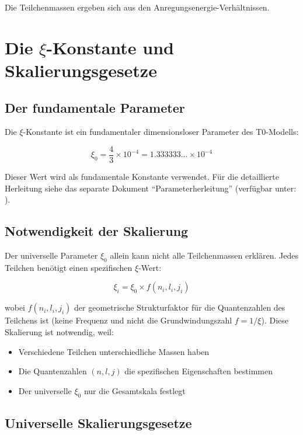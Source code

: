 	Die Teilchenmassen ergeben sich aus den Anregungsenergie-Verhältnissen.
	
	
\section{Die $\xi$-Konstante und Skalierungsgesetze}

\subsection{Der fundamentale Parameter}

Die $\xi$-Konstante ist ein fundamentaler dimensionsloser Parameter des T0-Modells:

\begin{equation}
	\boxed{\xi_0 = \frac{4}{3} \times 10^{-4} = 1.333333... \times 10^{-4}}
\end{equation}

	Dieser Wert wird als fundamentale Konstante verwendet. Für die detaillierte Herleitung 
	siehe das separate Dokument ``Parameterherleitung'' 
	(verfügbar unter: ).

\subsection{Notwendigkeit der Skalierung}

Der universelle Parameter $\xi_0$ allein kann nicht alle Teilchenmassen erklären. Jedes Teilchen benötigt einen spezifischen $\xi$-Wert:

\begin{equation}
	\xi_i = \xi_0 \times f(n_i, l_i, j_i)
\end{equation}

wobei $f(n_i, l_i, j_i)$ der geometrische Strukturfaktor für die Quantenzahlen des Teilchens ist (keine Frequenz und nicht die Grundwindungszahl $f = 1/\xi$). Diese Skalierung ist notwendig, weil:

\begin{itemize}
	\item Verschiedene Teilchen unterschiedliche Massen haben
	\item Die Quantenzahlen $(n, l, j)$ die spezifischen Eigenschaften bestimmen
	\item Der universelle $\xi_0$ nur die Gesamtskala festlegt
\end{itemize}

\subsection{Universelle Skalierungsgesetze}

